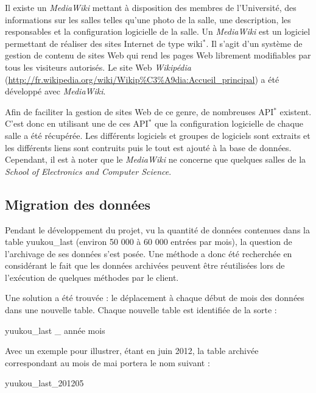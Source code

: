 Il existe un \textit{MediaWiki} mettant \`a disposition des membres de l'Universit\'e, des informations sur les salles telles qu'une photo de la salle, une description, les responsables et la configuration logicielle de la salle.
Un \textit{MediaWiki} est un logiciel permettant de r\'ealiser des sites Internet de type wiki$^*$. 
Il s'agit d'un syst\`eme de gestion de contenu de sites Web qui rend les pages Web librement modifiables par tous les visiteurs autoris\'es.
Le site Web \textit{Wikip\'edia} (\url{http://fr.wikipedia.org/wiki/Wikip\%C3\%A9dia:Accueil\_principal}) a \'et\'e d\'evelopp\'e avec \textit{MediaWiki}.

Afin de faciliter la gestion de sites Web de ce genre, de nombreuses API$^*$ existent.
C'est donc en utilisant une de ces API$^*$ que la configuration logicielle de chaque salle a \'et\'e r\'ecup\'er\'ee.
Les diff\'erents logiciels et groupes de logiciels sont extraits et les diff\'erents liens sont contruits puis le tout est ajout\'e \`a la base de donn\'ees.
Cependant, il est \`a noter que le \textit{MediaWiki} ne concerne que quelques salles de la \textit{School of Electronics and Computer Science}.

\subsection{Migration des donn\'ees}
\label{section:migrationDonnees}

Pendant le d\'eveloppement du projet, vu la quantit\'e de donn\'ees contenues dans la table \textsf{yuukou\_last} (environ 50 000 \`a 60 000 entr\'ees par mois), la question de l'archivage de ses donn\'ees s'est pos\'ee.
Une m\'ethode a donc \'et\'e recherch\'ee en consid\'erant le fait que les donn\'ees archiv\'ees peuvent \^etre r\'eutilis\'ees lors de l'ex\'ecution de quelques m\'ethodes par le client.

Une solution a \'et\'e trouv\'ee : le d\'eplacement \`a chaque d\'ebut de mois des donn\'ees dans une nouvelle table.
Chaque nouvelle table est identifi\'ee de la sorte : 

\begin{center}
	\textsf{yuukou\_last \_ ann\'ee mois}

\end{center}

Avec un exemple pour illustrer, \'etant en juin 2012, la table archiv\'ee correspondant au mois de mai portera le nom suivant : 

\begin{center}
	\textsf{yuukou\_last\_201205}

\end{center}

